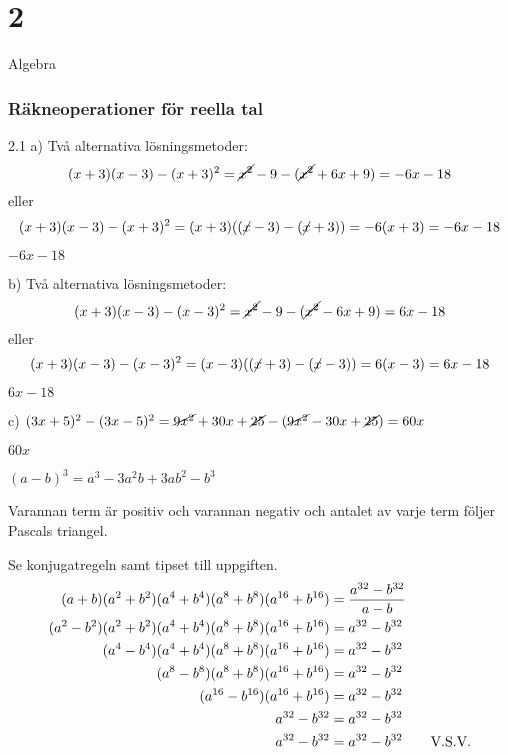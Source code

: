 \chapter{2}{Algebra}
\subsection*{Räkneoperationer för reella tal}

\begin{task}{2.1 a)}
	Två alternativa lösningsmetoder:
	\[(x+3)(x-3)-(x+3)^2=\cancel{x^2}-9-(\cancel{x^2}+6x+9)=-6x-18\]
	eller
	\[(x+3)(x-3)-(x+3)^2=(x+3)((\cancel{x}-3)-(\cancel{x}+3))=-6(x+3)=-6x-18\]
	
	\ans $-6x-18$
\end{task}

\begin{task}{b)}
	Två alternativa lösningsmetoder:
	\[(x+3)(x-3)-(x-3)^2=\cancel{x^2}-9-(\cancel{x^2}-6x+9)=6x-18\]
	eller
	\[(x+3)(x-3)-(x-3)^2=(x-3)((\cancel{x}+3)-(\cancel{x}-3))=6(x-3)=6x-18\]
	
	\ans $6x-18$
\end{task}

\begin{task}{c)}
	$(3x+5)^2-(3x-5)^2=\cancel{9x^2}+30x+\cancel{25}-(\cancel{9x^2}-30x+\cancel{25})=60x$
	
	\ans $60x$
\end{task}

\begin{task}{2.2}
	$(a-b)^3=a^3-3a^2b+3ab^2-b^3$ 
	
	\ans Varannan term är positiv och varannan negativ och antalet av varje term följer Pascals triangel.
\end{task}

\begin{task}{2.3}
	Se konjugatregeln samt tipset till uppgiften.
	\begin{align*}
	(a+b)(a^2+b^2)(a^4+b^4)(a^8+b^8)(a^{16}+b^{16})&=\frac{a^{32}-b^{32}}{a-b} \\
	(a^2-b^2)(a^2+b^2)(a^4+b^4)(a^8+b^8)(a^{16}+b^{16})&=a^{32}-b^{32} \\
	(a^4-b^4)(a^4+b^4)(a^8+b^8)(a^{16}+b^{16})&=a^{32}-b^{32} \\
	(a^8-b^8)(a^8+b^8)(a^{16}+b^{16})&=a^{32}-b^{32} \\
	(a^{16}-b^{16})(a^{16}+b^{16})&=a^{32}-b^{32} \\
	a^{32}-b^{32}&=a^{32}-b^{32} \\
	a^{32}-b^{32}&=a^{32}-b^{32}\text{\qquad V.S.V.}
	\end{align*}
\end{task}

